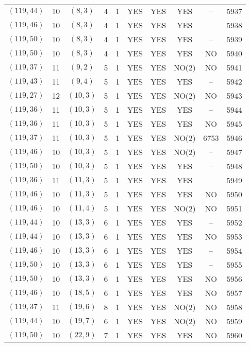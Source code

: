 \begin{longtable}{|c|c|c|c|c|c|c|c|c|c|}
$(119, 44)$ & 10 & $(8, 3)$ & 4 & 1 & YES & YES & YES & -- & 5937\\
$(119, 46)$ & 10 & $(8, 3)$ & 4 & 1 & YES & YES & YES & -- & 5938\\
$(119, 50)$ & 10 & $(8, 3)$ & 4 & 1 & YES & YES & YES & -- & 5939\\
$(119, 50)$ & 10 & $(8, 3)$ & 4 & 1 & YES & YES & YES & NO & 5940\\
$(119, 37)$ & 11 & $(9, 2)$ & 5 & 1 & YES & YES & NO(2) & NO & 5941\\
$(119, 43)$ & 11 & $(9, 4)$ & 5 & 1 & YES & YES & YES & -- & 5942\\
$(119, 27)$ & 12 & $(10, 3)$ & 5 & 1 & YES & YES & NO(2) & NO & 5943\\
$(119, 36)$ & 11 & $(10, 3)$ & 5 & 1 & YES & YES & YES & -- & 5944\\
$(119, 36)$ & 11 & $(10, 3)$ & 5 & 1 & YES & YES & YES & NO & 5945\\
$(119, 37)$ & 11 & $(10, 3)$ & 5 & 1 & YES & YES & NO(2) & 6753 & 5946\\
$(119, 46)$ & 10 & $(10, 3)$ & 5 & 1 & YES & YES & NO(2) & -- & 5947\\
$(119, 50)$ & 10 & $(10, 3)$ & 5 & 1 & YES & YES & YES & -- & 5948\\
$(119, 36)$ & 11 & $(11, 3)$ & 5 & 1 & YES & YES & YES & -- & 5949\\
$(119, 46)$ & 10 & $(11, 3)$ & 5 & 1 & YES & YES & YES & NO & 5950\\
$(119, 46)$ & 10 & $(11, 4)$ & 5 & 1 & YES & YES & NO(2) & NO & 5951\\
$(119, 44)$ & 10 & $(13, 3)$ & 6 & 1 & YES & YES & YES & -- & 5952\\
$(119, 44)$ & 10 & $(13, 3)$ & 6 & 1 & YES & YES & YES & NO & 5953\\
$(119, 46)$ & 10 & $(13, 3)$ & 6 & 1 & YES & YES & YES & -- & 5954\\
$(119, 50)$ & 10 & $(13, 3)$ & 6 & 1 & YES & YES & YES & -- & 5955\\
$(119, 50)$ & 10 & $(13, 3)$ & 6 & 1 & YES & YES & YES & NO & 5956\\
$(119, 46)$ & 10 & $(18, 5)$ & 6 & 1 & YES & YES & YES & NO & 5957\\
$(119, 37)$ & 11 & $(19, 6)$ & 8 & 1 & YES & YES & NO(2) & NO & 5958\\
$(119, 44)$ & 10 & $(19, 7)$ & 6 & 1 & YES & YES & NO(2) & NO & 5959\\
$(119, 50)$ & 10 & $(22, 9)$ & 7 & 1 & YES & YES & YES & NO & 5960\\

\end{longtable}
